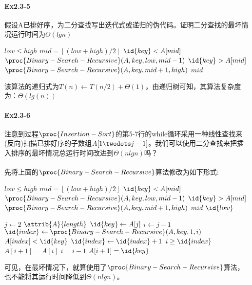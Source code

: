 \documentclass[a4paper,11pt]{article}
\newcommand{\floor}[1]{\left\lfloor #1 \right\rfloor}
\begin{document}
\paragraph*{Ex2.3-5}
假设A已排好序，为二分查找写出迭代式或递归的伪代码。证明二分查找的最坏情况运行时间为$\Theta(lgn)$
\begin{codebox}
	\li \If $low \leq high$
	\li 	\Then
			$mid = \floor{(low + high) / 2}$
	\li		\If $\id{key} < A[mid]$
	\li			\Then \Return $\proc{Binary-Search-Recursive}(A, key, low, mid - 1)$	
	\li		\ElseIf $\id{key} > A[mid]$
	\li			\Then \Return $\proc{Binary-Search-Recursive}(A, key, mid + 1, high)$
	\li		\ElseNoIf
	\li			\Return $mid$
			\End
	\li	\Else
   	\li 	\Return {}		
		\End	
\end{codebox}
\noindent 该算法的递归式为$T(n) \gets T(n/2) + \Theta(1)$，由递归树可知，其算法复杂度为：$\Theta(lg(n))$
\paragraph*{Ex2.3-6}
注意到过程$\proc{Insertion-Sort}$的第5-7行的while循环采用一种线性查找来(反向)扫描已排好序的子数组$A[1 \twodots j-1]$。我们可以使用二分查找来把插入排序的最坏情况总运行时间改进到$\Theta(nlgn)$吗？

\paragraph{}先将上面的$\proc{Binary-Search-Recursive}$算法修改为如下形式:
\begin{codebox}
	\li \If $low \leq high$
	\li 	\Then
			$mid = \floor{(low + high) / 2}$
	\li		\If $\id{key} < A[mid]$
	\li			\Then \Return $\proc{Binary-Search-Recursive}(A, key, low, mid - 1)$	
	\li		\ElseIf $\id{key} > A[mid]$
	\li			\Then \Return $\proc{Binary-Search-Recursive}(A, key, mid + 1, high)$
	\li		\ElseNoIf
	\li			\Return $mid$
			\End
	\li	\Else
	\li 	\Return $\id{low}$	
		\End	
\end{codebox}
\begin{codebox}
	\li \For $j \gets 2 $ \To $\attrib{A}{length}$
	\li \Do
			$\id{key} \gets A[j]$
	\li		$i \gets j - 1$
	\li		$\id{index} \gets \proc{Binary-Search-Recursive}(A, key, 1, i)$
	\li 	\If $A[index] < \id{key}$
	\li			\Then 
				$\id{index} \gets \id{index} + 1$
				\End
	\li		\While $i \geq \id{index}$
	\li			\Do
				$A[i + 1] = A[i]$
	\li			$i = i - 1$
				\End
	\li		$A[i+1] = \id{key}$
		\End
	
\end{codebox}
\noindent 可见，在最坏情况下，就算使用了$\proc{Binary-Search-Recursive}$算法，也不能将其运行时间降低到$\Theta(nlgn)$。
\end{document}

